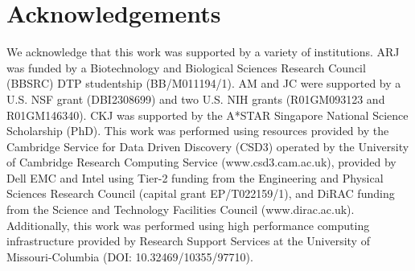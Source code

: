 \section{Acknowledgements}
We acknowledge that this work was supported by a variety of institutions. ARJ was funded by a Biotechnology and Biological Sciences Research Council (BBSRC) DTP studentship (BB/M011194/1). AM and JC were supported by a U.S. NSF grant (DBI2308699) and two U.S. NIH grants (R01GM093123 and R01GM146340). CKJ was supported by the A*STAR Singapore National Science Scholarship (PhD). This work was performed using resources provided by the Cambridge Service for Data Driven Discovery (CSD3) operated by the University of Cambridge Research Computing Service (www.csd3.cam.ac.uk), provided by Dell EMC and Intel using Tier-2 funding from the Engineering and Physical Sciences Research Council (capital grant EP/T022159/1), and DiRAC funding from the Science and Technology Facilities Council (www.dirac.ac.uk). Additionally, this work was performed using high performance computing infrastructure provided by Research Support Services at the University of Missouri-Columbia (DOI: 10.32469/10355/97710).